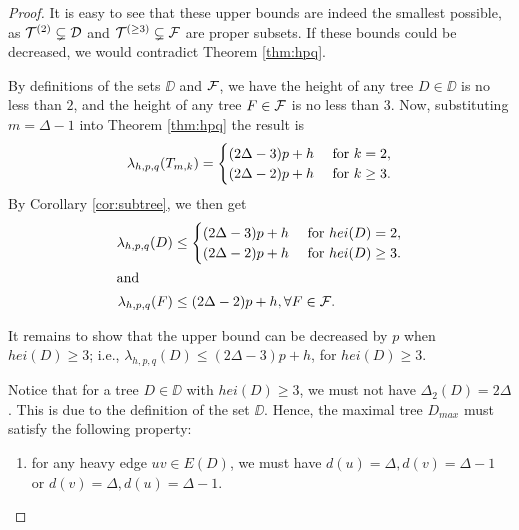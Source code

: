 \begin{proof}
It is easy to see that these upper bounds are indeed the smallest possible, as ${\cal T}^{(2)} \subsetneq {\cal D}$ and ${\cal T}^{(\ge 3)} \subsetneq {\cal F}$ are proper subsets. If these bounds could be decreased, we would contradict Theorem \ref{thm:hpq}. 

By definitions of  the sets $\DD$ and ${\cal F}$, we have the height of any tree $D \in \DD$ is no less than $2$, and the height of any tree $F \in {\cal F}$ is no less than $3$. Now, substituting $m = \Delta-1$ into Theorem \ref{thm:hpq} the result is 
\begin{align}
\lambda_{h,p,q}(T_{m,k}) = 
 \begin{cases}
 (2\Delta-3)p + h & \text{ for } k=2, \\
 (2\Delta-2)p + h & \text{ for } k \ge 3. 
 \end{cases}
\end{align} 
By Corollary \ref{cor:subtree}, we then get 
\begin{align*}
\lambda_{h,p,q}(D) &\le 
 \begin{cases}
 (2\Delta-3)p + h  & \text{ for } hei(D) = 2, \\
 (2\Delta-2)p + h & \text{ for } hei(D) \ge 3. 
 \end{cases} \\
\intertext{and}
\lambda_{h,p,q}(F) &\le (2\Delta-2)p + h, \forall F \in {\cal F}. 
\end{align*} 

It remains to show that the upper bound can be decreased by $p$ when $hei(D) \ge 3$; i.e., $\lambda_{h,p,q}(D) \le (2\Delta-3)p+h$, for $hei(D) \ge 3$. 

Notice that for a tree $D \in \DD$ with $hei(D) \ge 3$, we must not have $\Delta_2(D) = 2\Delta$. This is due to the definition of the set $\DD$. Hence, the maximal tree $D_{max}$ must satisfy the following property: 
\begin{enumerate}[(*)]
\item for any heavy edge $uv \in E(D)$, we must have $d(u) = \Delta, d(v) = \Delta-1$ or $d(v) = \Delta, d(u) = \Delta-1$. 
\end{enumerate}


\end{proof}
